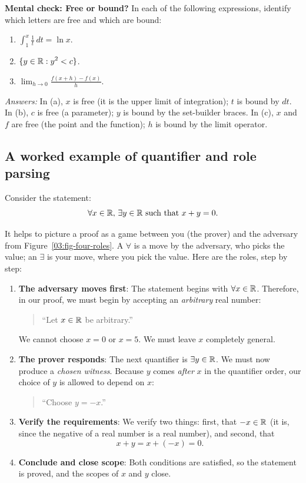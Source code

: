 \begin{recoverybox}
\textbf{Mental check: Free or bound?}
In each of the following expressions, identify which letters are free and which are bound:
\begin{enumerate}[label=(\alph*)]
\item $\displaystyle \int_1^x \frac{1}{t} \, dt = \ln x$.
\item $\displaystyle \{y \in \mathbb{R} : y^2 < c\}$.
\item $\displaystyle \lim_{h \to 0} \frac{f(x+h) - f(x)}{h}$.
\end{enumerate}
\emph{Answers:} In (a), $x$ is free (it is the upper limit of integration); $t$ is bound by $dt$. In (b), $c$ is free (a parameter); $y$ is bound by the set-builder braces. In (c), $x$ and $f$ are free (the point and the function); $h$ is bound by the limit operator.
\end{recoverybox}

\subsection{A worked example of quantifier and role parsing}

Consider the statement:
\[
\forall x \in \mathbb{R}, \, \exists y \in \mathbb{R} \text{ such that } x + y = 0.
\]

It helps to picture a proof as a game between you (the prover) and the adversary from Figure~\ref{03:fig-four-roles}. A $\forall$ is a move by the adversary, who picks the value; an $\exists$ is your move, where you pick the value. Here are the roles, step by step:
\begin{enumerate}
\item \textbf{The adversary moves first}: The statement begins with $\forall x \in \mathbb{R}$. Therefore, in our proof, we must begin by accepting an \emph{arbitrary} real number:
\begin{quote}
``Let $x \in \mathbb{R}$ be arbitrary.''
\end{quote}
We cannot choose $x = 0$ or $x = 5$. We must leave $x$ completely general.
\item \textbf{The prover responds}: The next quantifier is $\exists y \in \mathbb{R}$. We must now produce a \emph{chosen witness}. Because $y$ comes \emph{after} $x$ in the quantifier order, our choice of $y$ is allowed to depend on $x$:
\begin{quote}
``Choose $y = -x$.''
\end{quote}
\item \textbf{Verify the requirements}: We verify two things: first, that $-x \in \mathbb{R}$ (it is, since the negative of a real number is a real number), and second, that
\[
x + y = x + (-x) = 0.
\]
\item \textbf{Conclude and close scope}: Both conditions are satisfied, so the statement is proved, and the scopes of $x$ and $y$ close.
\end{enumerate}

